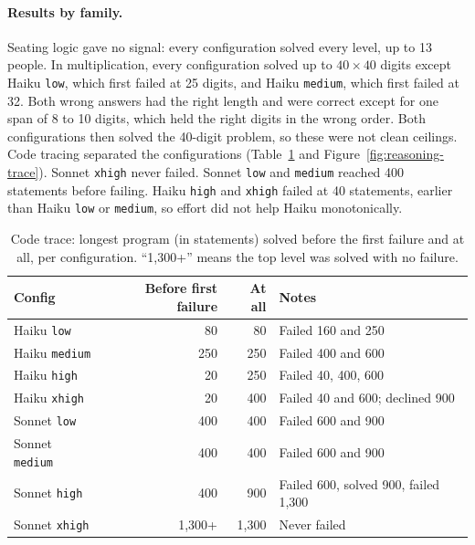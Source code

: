 \paragraph{Results by family.} Seating logic gave no signal: every configuration solved every level, up to 13 people. In multiplication, every configuration solved up to $40 \times 40$ digits except Haiku \texttt{low}, which first failed at 25 digits, and Haiku \texttt{medium}, which first failed at 32. Both wrong answers had the right length and were correct except for one span of 8 to 10 digits, which held the right digits in the wrong order. Both configurations then solved the 40-digit problem, so these were not clean ceilings. Code tracing separated the configurations (Table~\ref{tab:trace} and Figure~\ref{fig:reasoning-trace}). Sonnet \texttt{xhigh} never failed. Sonnet \texttt{low} and \texttt{medium} reached 400 statements before failing. Haiku \texttt{high} and \texttt{xhigh} failed at 40 statements, earlier than Haiku \texttt{low} or \texttt{medium}, so effort did not help Haiku monotonically.

\begin{table}[H]
\centering
\caption{Code trace: longest program (in statements) solved before the first failure and at all, per configuration. ``1,300+'' means the top level was solved with no failure.}
\label{tab:trace}
\small
\begin{tabular}{l r r l}
\toprule
\textbf{Config} & \textbf{Before first failure} & \textbf{At all} & \textbf{Notes} \\
\midrule
Haiku \texttt{low}     & 80      & 80    & Failed 160 and 250 \\
Haiku \texttt{medium}  & 250     & 250   & Failed 400 and 600 \\
Haiku \texttt{high}    & 20      & 250   & Failed 40, 400, 600 \\
Haiku \texttt{xhigh}   & 20      & 400   & Failed 40 and 600; declined 900 \\
Sonnet \texttt{low}    & 400     & 400   & Failed 600 and 900 \\
Sonnet \texttt{medium} & 400     & 400   & Failed 600 and 900 \\
Sonnet \texttt{high}   & 400     & 900   & Failed 600, solved 900, failed 1,300 \\
Sonnet \texttt{xhigh}  & 1,300+  & 1,300 & Never failed \\
\bottomrule
\end{tabular}
\end{table}

